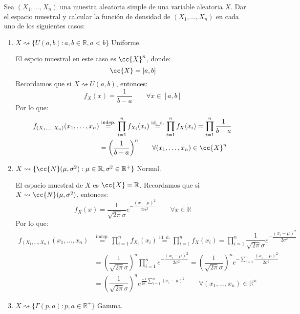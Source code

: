 \begin{ejercicio}
    Sea $(X_1, \ldots, X_n)$ una muestra aleatoria simple de una variable aleatoria $X$. Dar el espacio muestral y calcular la función de densidad de $(X_1, \ldots, X_n)$ en cada uno de los siguientes casos:
    \begin{enumerate}[label=\alph*)]
        \item $X\rightsquigarrow\{U(a,b) : a,b\in \mathbb{R}, a<b\}$ Uniforme.

            El espcio muestral en este caso es $\cc{X}^n$, donde:
            \begin{equation*}
                \cc{X} = [a,b]
            \end{equation*}
            Recordamos que si $X\rightsquigarrow U(a,b)$, entonces:
            \begin{equation*}
                f_X(x) = \dfrac{1}{b-a} \qquad \forall x\in [a,b]
            \end{equation*}
            Por lo que:
            \begin{align*}
                f_{(X_1, \ldots, X_n)}(x_1, \ldots, x_n) &\stackrel{\text{indep.}}{=} \prod_{i=1}^{n} f_{X_i}(x_i) \stackrel{\text{id. d.}}{=} \prod_{i=1}^{n} f_X(x_i) = \prod_{i=1}^{n} \dfrac{1}{b-a} \\ &= {\left(\dfrac{1}{b-a}\right)}^{n} \qquad \forall (x_1, \ldots, x_n) \in \cc{X}^n
            \end{align*}

        \item $X\rightsquigarrow\{\cc{N}(\mu, \sigma^2) : \mu \in \mathbb{R}, \sigma^2 \in \mathbb{R}^+\}$ Normal.

            El espacio muestral de $X$ es $\cc{X} = \mathbb{R}$. Recordamos que si $X\rightsquigarrow \cc{N}(\mu, \sigma^2)$, entonces:
            \begin{equation*}
                f_X(x) = \dfrac{1}{\sqrt{2\pi} \sigma} e^{-\dfrac{{(x-\mu)}^{2}}{2\sigma^2}} \qquad \forall x\in \mathbb{R}
            \end{equation*}
            Por lo que:
            \begin{align*}
                f_{(X_1, \ldots, X_n)}(x_1, \ldots, x_n) &\stackrel{\text{indep.}}{=} \prod_{i=1}^{n} f_{X_i}(x_i) \stackrel{\text{id. d.}}{=} \prod_{i=1}^{n} f_X(x_i) 
                = \prod_{i=1}^{n} \dfrac{1}{\sqrt{2\pi} \sigma} e^{-\dfrac{{(x_i-\mu)}^{2}}{2\sigma^2}}  \\
                &= {\left(\dfrac{1}{\sqrt{2\pi}\sigma}\right)}^{n} \prod_{i=1}^{n} e^{-\dfrac{{(x_i-\mu)}^{2}}{2\sigma^2}}  = {\left(\dfrac{1}{\sqrt{2\pi}\sigma}\right)}^{n} e^{-\sum\limits_{i=1}^n\dfrac{{(x_i-\mu)}^{2}}{2\sigma^2}}   \\
                &= {\left(\dfrac{1}{\sqrt{2\pi}\sigma}\right)}^{n} e^{\frac{-1}{2\sigma^2}\sum\limits_{i=1}^n {(x_i-\mu)}^{2}} \qquad \forall (x_1,\ldots,x_n) \in \mathbb{R}^n
            \end{align*}
        \item $X\rightsquigarrow\{\Gamma(p,a) : p,a\in \mathbb{R}^+\}$ Gamma.


\end{enumerate}
\end{ejercicio}
